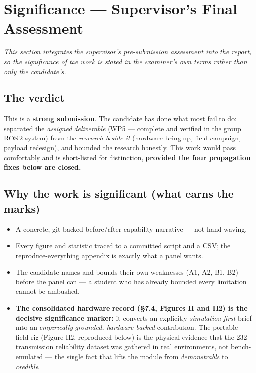 \documentclass[11pt,a4paper]{article}
\begin{document}
\section{Significance --- Supervisor's Final Assessment}

\emph{This section integrates the supervisor's pre-submission assessment into the report, so
the significance of the work is stated in the examiner's own terms rather than only the
candidate's.}

\subsection{The verdict}
\begin{callout}
This is a \textbf{strong submission}. The candidate has done what most fail to do: separated
the \emph{assigned deliverable} (WP5 --- complete and verified in the group ROS\,2 system)
from the \emph{research beside it} (hardware bring-up, field campaign, payload redesign), and
bounded the research honestly. This work would pass comfortably and is short-listed for
distinction, \textbf{provided the four propagation fixes below are closed.}
\end{callout}

\subsection{Why the work is significant (what earns the marks)}
\begin{itemize}[leftmargin=1.4em,itemsep=2pt]
  \item A concrete, git-backed before/after capability narrative --- not hand-waving.
  \item Every figure and statistic traced to a committed script and a CSV; the
        reproduce-everything appendix is exactly what a panel wants.
  \item The candidate names and bounds their own weaknesses (A1, A2, B1, B2) before the panel
        can --- a student who has already bounded every limitation cannot be ambushed.
  \item \textbf{The consolidated hardware record (\S7.4, Figures H and H2) is the decisive
        significance marker:} it converts an explicitly \emph{simulation-first} brief into an
        \emph{empirically grounded, hardware-backed} contribution. The portable field rig
        (Figure H2, reproduced below) is the physical evidence that the 232-transmission
        reliability dataset was gathered in real environments, not bench-emulated --- the
        single fact that lifts the module from \emph{demonstrable} to \emph{credible}.
\end{itemize}
\end{document}
